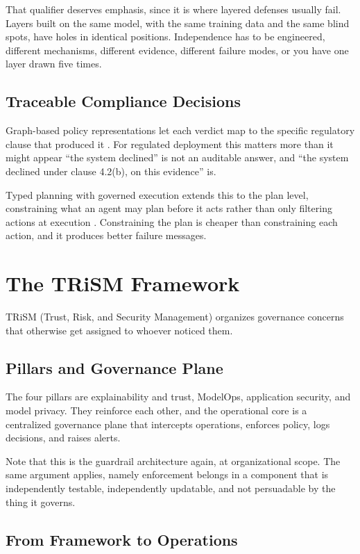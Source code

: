 That qualifier deserves emphasis, since it is where layered defenses usually fail.
Layers built on the same model, with the same training data and the same blind
spots, have holes in identical positions. Independence has to be engineered, different mechanisms, different evidence, different failure modes, or you have
one layer drawn five times.

\subsection{Traceable Compliance Decisions}

Graph-based policy representations let each verdict map to the specific regulatory
clause that produced it \cite{graphcompliance2025}. For regulated deployment this
matters more than it might appear ``the system declined'' is not an auditable
answer, and ``the system declined under clause 4.2(b), on this evidence'' is.

Typed planning with governed execution extends this to the plan level, constraining
what an agent may plan before it acts rather than only filtering actions at
execution \cite{polaris2026}. Constraining the plan is cheaper than constraining
each action, and it produces better failure messages.

\section{The TRiSM Framework}

TRiSM (Trust, Risk, and Security Management) organizes governance concerns that
otherwise get assigned to whoever noticed them.

\subsection{Pillars and Governance Plane}

The four pillars are explainability and trust, ModelOps, application security, and model privacy. They reinforce each other, and the operational core is a centralized governance plane that intercepts operations, enforces policy, logs decisions, and raises alerts.

Note that this is the guardrail architecture again, at organizational scope. The
same argument applies, namely enforcement belongs in a component that is independently
testable, independently updatable, and not persuadable by the thing it governs.

\subsection{From Framework to Operations}

